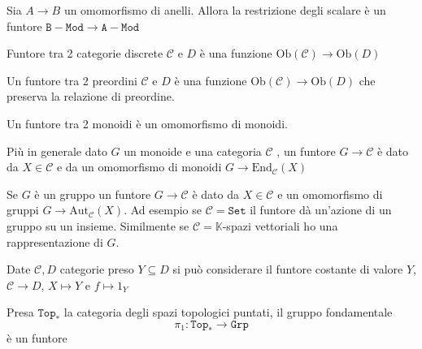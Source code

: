 \begin{example}{}
    Sia \(A \to B\) un omomorfismo di anelli. Allora la restrizione degli
    scalare è un funtore \(\mathtt{B-Mod} \to \mathtt{A-Mod}\) 
\end{example}


\begin{example}{}
    Funtore tra 2 categorie discrete \(\mathcal{C}\) e \(D\) è una funzione \(\mathrm{Ob}{(\mathcal{C})} \to \mathrm{Ob}{(D)}\) 
\end{example}

\begin{example}{}
    Un funtore tra 2 preordini \(\mathcal{C}\) e \(D\) è una funzione \(\mathrm{Ob}{(\mathcal{C})} \to \mathrm{Ob}{(D)}\)  che preserva la relazione di preordine.
\end{example}

\begin{example}{}
    Un funtore tra 2 monoidi è un omomorfismo di monoidi.

    Più in generale dato \(G\)  un monoide e una categoria \(\mathcal{C}\) , un funtore \(G \to \mathcal{C}\) è dato da \(X \in \mathcal{C}\) e da un omomorfismo di monoidi \(G \to \mathrm{End}_\mathcal{C}{(X)}\) 

    Se \(G\) è un gruppo un funtore \(G \to \mathcal{C}\) è dato da \(X \in \mathcal{C}\) e un
    omomorfismo di gruppi \(G \to \mathrm{Aut}_\mathcal{C}{(X)}\). Ad esempio se \(\mathcal{C} = \mathtt{Set}\) il funtore dà un'azione di un gruppo su un insieme.
    Similmente se \(\mathcal{C} = \mathbb{K}\)-spazi vettoriali ho una rappresentazione di
    \(G\).
\end{example}

\begin{example}
    Date \(\mathcal{C}, D\) categorie preso \(Y \subseteq D \) si può considerare il
    funtore costante di valore \(Y\), \(\mathcal{C} \to D\), \(X \mapsto Y\) e \(f \mapsto 1_Y\) 
\end{example}

\begin{example}{}
    Presa \(\mathtt{Top}_*\) la categoria degli spazi topologici puntati, il
    gruppo fondamentale 
    \[
        \pi_{1} : \mathtt{Top}_* \to \mathtt{Grp}
    \]
    è un funtore
\end{example}

